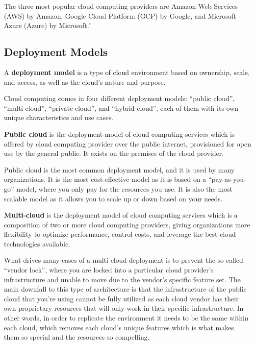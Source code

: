 The three most popular cloud computing providers are Amazon Web Services (AWS) by Amazon, Google Cloud Platform (GCP)
by Google, and Microsoft Azure (Azure) by Microsoft. \v


\subsection{Deployment Models}

A \textbf{deployment model} is a type of cloud environment based on ownership, scale, and access, as well as the cloud's
nature and purpose.
\ed

Cloud computing comes in four different deployment models: ``public cloud'', ``multi-cloud'', ``private cloud'', and
``hybrid cloud'', each of them with its own unique characteristics and use cases.

\textbf{Public cloud} is the deployment model of cloud computing services which is offered by cloud computing provider
over the public internet, provisioned for open use by the general public. It exists on the premises of the cloud
provider.
\ed


Public cloud is the most common deployment model, and it is used by many organizations. It is the most cost-effective
model as it is based on a ``pay-as-you-go'' model, where you only pay for the resources you use. It is also the most
scalable model as it allows you to scale up or down based on your needs.

\textbf{Multi-cloud} is the deployment model of cloud computing services which is a composition of two or more cloud
computing providers, giving organizations more flexibility to optimize performance, control costs, and leverage the
best cloud technologies available.
\ed


What drives many cases of a multi cloud deployment is to prevent the so called ``vendor lock'', where you are locked
into a particular cloud provider's infrastructure and unable to move due to the vendor's specific feature set. The
main downfall to this type of architecture is that the infrastructure of the public cloud that you're using cannot
be fully utilized as each cloud vendor has their own proprietary resources that will only work in their specific
infrastructure. In other words, in order to replicate the environment it needs to be the same within each cloud,
which removes each cloud's unique features which is what makes them so special and the resources so compelling.

